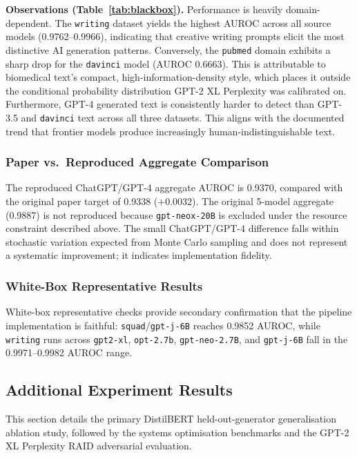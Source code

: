 \documentclass[conference]{IEEEtran}
\begin{document}
\textbf{Observations (Table~\ref{tab:blackbox}).} Performance is heavily domain-dependent. The
\texttt{writing} dataset yields the highest AUROC across all source models
(0.9762--0.9966), indicating that creative writing prompts elicit the most
distinctive AI generation patterns. Conversely, the \texttt{pubmed} domain
exhibits a sharp drop for the \texttt{davinci} model (AUROC 0.6663). This is
attributable to biomedical text's compact, high-information-density style,
which places it outside the conditional probability distribution GPT-2 XL Perplexity
was calibrated on. Furthermore, GPT-4 generated text is consistently harder to
detect than GPT-3.5 and \texttt{davinci} text across all three datasets. This
aligns with the documented trend that frontier models produce increasingly
human-indistinguishable text.

\subsubsection{Paper vs.\ Reproduced Aggregate Comparison}

The reproduced ChatGPT/GPT-4 aggregate AUROC is 0.9370, compared with the
original paper target of 0.9338 ($+0.0032$). The original 5-model aggregate
(0.9887) is not reproduced because \texttt{gpt-neox-20B} is excluded under the
resource constraint described above. The small ChatGPT/GPT-4 difference falls
within stochastic variation expected from Monte Carlo sampling and does not
represent a systematic improvement; it indicates implementation fidelity.

\subsubsection{White-Box Representative Results}

White-box representative checks provide secondary confirmation that the
pipeline implementation is faithful: \texttt{squad}/\texttt{gpt-j-6B} reaches
0.9852 AUROC, while \texttt{writing} runs across \texttt{gpt2-xl},
\texttt{opt-2.7b}, \texttt{gpt-neo-2.7B}, and \texttt{gpt-j-6B} fall in the
0.9971--0.9982 AUROC range.

\subsection{Additional Experiment Results}\label{ssec:additional}

This section details the primary DistilBERT held-out-generator generalisation
ablation study, followed by the systems optimisation benchmarks and
the GPT-2 XL Perplexity RAID adversarial evaluation.
\end{document}
